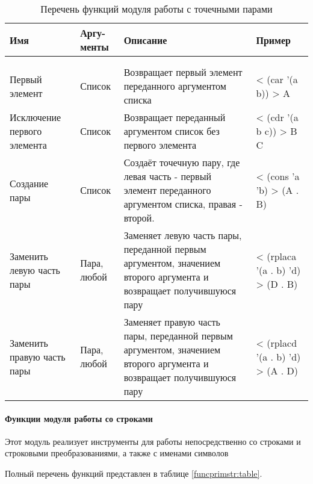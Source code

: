 \begin{xltabular}{\textwidth}{|p{3.6cm}|p{1.8cm}|p{6cm}|X|}
	\caption{Перечень функций модуля работы с точечными парами\label{funcprimpair:table}}\\ \hline
	\centrow Имя & \centrow Аргу- \linebreak менты & \centrow Описание & \centrow Пример \\ \hline
	 &  &  &  \\ \hline
	\endfirsthead
	 &  &  &  \\ \hline
	\finishhead
	Первый элемент & Список & Возвращает первый элемент переданного аргументом списка & < (car '(a b)) \linebreak > A \\ \hline 
	Исключение первого элемента & Список & Возвращает переданный аргументом список без первого элемента & < (cdr '(a b c)) \linebreak > B C \\ \hline 
	Создание пары & Список & Создаёт точечную пару, где левая часть - первый элемент переданного аргументом списка, правая - второй. & < (cons 'a 'b) \linebreak > (A . B) \\ \hline 
	Заменить левую часть пары & Пара, любой & Заменяет левую часть пары, переданной первым аргументом, значением второго аргумента и возвращает получившуюся пару & < (rplaca '(a . b) 'd) \linebreak > (D . B) \\ \hline 
	Заменить правую часть пары & Пара, любой & Заменяет правую часть пары, переданной первым аргументом, значением второго аргумента и возвращает получившуюся пару & < (rplacd '(a . b) 'd) \linebreak > (A . D)
	
\end{xltabular}

\paragraph{Функции модуля работы со строками}

Этот модуль реализует инструменты для работы непосредственно со строками и строковыми преобразованиями, а также с именами символов

Полный перечень функций представлен в таблице \ref{funcprimstr:table}.


